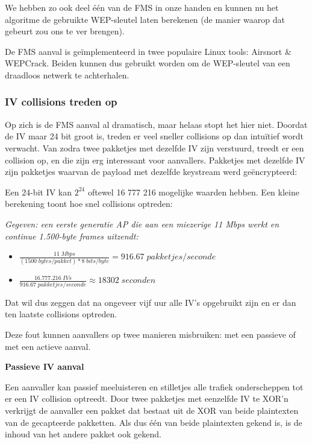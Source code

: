 \documentclass[
  10pt,
  dutch,
  paper=a4,
  ,captions=tableheading
]{scrbook}
\providecommand{\tightlist}{%
  \setlength{\itemsep}{0pt}\setlength{\parskip}{0pt}}
\begin{document}
We hebben zo ook deel één van de FMS in onze handen en kunnen nu het
algoritme de gebruikte WEP-sleutel laten berekenen (de manier waarop dat
gebeurt zou ons te ver brengen).

\begin{tipblock}
De FMS aanval is geïmplementeerd in twee populaire Linux tools: Airsnort
\& WEPCrack. Beiden kunnen dus gebruikt worden om de WEP-sleutel van een
draadloos netwerk te achterhalen.
\end{tipblock}

\subsubsection{IV collisions treden op}\label{iv-collisions-treden-op}

Op zich is de FMS aanval al dramatisch, maar helaas stopt het hier niet.
Doordat de IV maar 24 bit groot is, treden er veel sneller collisions op
dan intuïtief wordt verwacht. Van zodra twee pakketjes met dezelfde IV
zijn verstuurd, treedt er een collision op, en die zijn erg interessant
voor aanvallers. Pakketjes met dezelfde IV zijn pakketjes waarvan de
payload met dezelfde keystream werd geëncrypteerd:

Een 24-bit IV kan \(2^{24}\) oftewel 16 777 216 mogelijke waarden
hebben. Een kleine berekening toont hoe snel collisions optreden:

\emph{Gegeven: een eerste generatie AP die aan een miezerige 11 Mbps
werkt en continue 1.500-byte frames uitzendt:}

\begin{itemize}
\tightlist
\item
  \(\frac{11\;Mbps}{(1500\; bytes/pakket)* 8\;bits/byte} =  916.67\;pakketjes/seconde\)
\item
  \(\frac{16.777.216\;IVs}{916.67\;pakketjes/seconde} \approx  18302 \;seconden\)
\end{itemize}

Dat wil dus zeggen dat na ongeveer vijf uur alle IV's opgebruikt zijn en
er dan ten laatste collisions optreden.

Deze fout kunnen aanvallers op twee manieren misbruiken: met een
passieve of met een actieve aanval.

\textbf{Passieve IV aanval}

Een aanvaller kan passief meeluisteren en stilletjes alle trafiek
onderscheppen tot er een IV collision optreedt. Door twee pakketjes met
eenzelfde IV te XOR'n verkrijgt de aanvaller een pakket dat bestaat uit
de XOR van beide plaintexten van de gecapteerde pakketten. Als dus één
van beide plaintexten gekend is, is de inhoud van het andere pakket ook
gekend.
\end{document}
